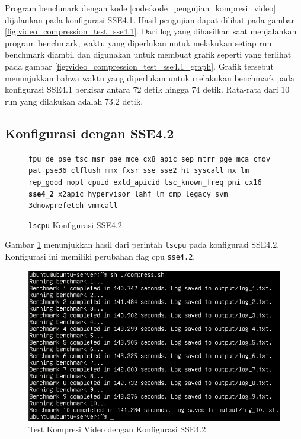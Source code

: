 Program benchmark dengan kode \ref{code:kode_pengujian_kompresi_video} dijalankan pada konfigurasi SSE4.1. Hasil pengujian dapat dilihat pada gambar \ref{fig:video_compression_test_sse4.1}. Dari log yang dihasilkan saat menjalankan program benchmark, waktu yang diperlukan untuk melakukan setiap run benchmark diambil dan digunakan untuk membuat grafik seperti yang terlihat pada gambar \ref{fig:video_compression_test_sse4.1_graph}. Grafik tersebut menunjukkan bahwa waktu yang diperlukan untuk melakukan benchmark pada konfigurasi SSE4.1 berkisar antara 72 detik hingga 74 detik. Rata-rata dari 10 run yang dilakukan adalah 73.2 detik.

\subsection{Konfigurasi dengan SSE4.2}
\begin{figure}
    \texttt{fpu de pse tsc msr pae mce cx8 apic sep mtrr pge mca cmov pat pse36 clflush mmx fxsr sse sse2 ht syscall nx lm rep\_good nopl cpuid extd\_apicid tsc\_known\_freq pni cx16 \textbf{sse4\_2} x2apic hypervisor lahf\_lm cmp\_legacy svm 3dnowprefetch vmmcall}
    \caption{\texttt{lscpu} Konfigurasi SSE4.2}
    \label{fig:lscpu_video_compression_test_sse4.2}
\end{figure}

Gambar \ref{fig:lscpu_video_compression_test_sse4.2} menunjukkan hasil dari perintah \texttt{lscpu} pada konfigurasi SSE4.2. Konfigurasi ini memiliki perubahan flag cpu \texttt{sse4.2}.

\begin{figure}
    \centering
    \includegraphics[width=1\textwidth]
    {assets/pics/video-compression-test/sse4.2.jpeg}
    \caption{Test Kompresi Video dengan Konfigurasi SSE4.2}
    \label{fig:video_compression_test_sse4.2}
\end{figure}

